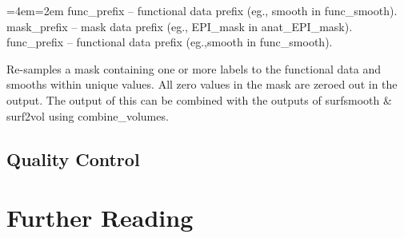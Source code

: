 \documentclass[final,titlepage,letterpaper,oneside,12pt]{article}
\renewcommand{\texttt}[2][BrickRed]{\textcolor{#1}{\ttfamily #2}}%
\newenvironment{blockquote}{%
  \par%
  \medskip
  \leftskip=4em\rightskip=2em%
  \noindent\ignorespaces}{%
  \par\medskip}
\begin{document}
\begin{blockquote}
func\_prefix -- functional data prefix (eg., smooth in func\_smooth).
mask\_prefix -- mask data prefix (eg., EPI\_mask in anat\_EPI\_mask).
func\_prefix -- functional data prefix (eg.,smooth in func\_smooth).
\end{blockquote}

\noindent Re-samples a mask containing one or more labels to the functional data and smooths within unique values. All zero values in the mask are zeroed out in the output. The output of this can be combined with the outputs of \texttt{surfsmooth} \& \texttt{surf2vol} using \texttt{combine\_volumes}.

\subsection{Quality Control}

\section{Further Reading}

\newpage 


\end{document}
